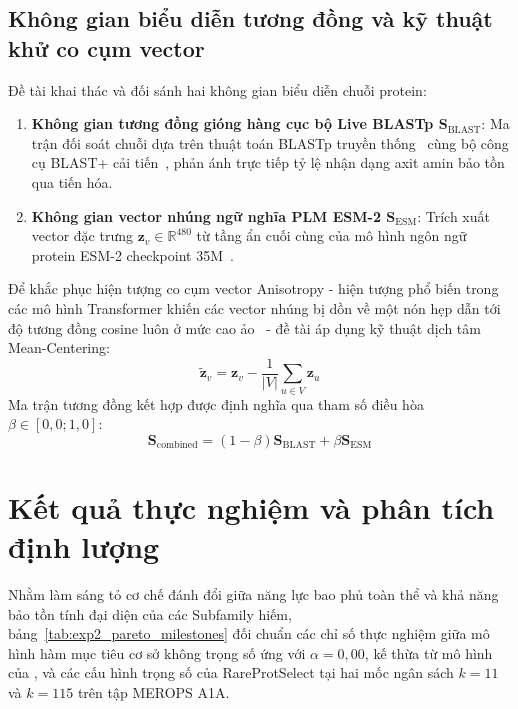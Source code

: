 \subsection{Không gian biểu diễn tương đồng và kỹ thuật khử co cụm vector}
Đề tài khai thác và đối sánh hai không gian biểu diễn chuỗi protein:
\begin{enumerate}[noitemsep,topsep=2pt]
    \item \textbf{Không gian tương đồng gióng hàng cục bộ Live BLASTp $\mathbf{S}_{\text{BLAST}}$}: Ma trận đối soát chuỗi dựa trên thuật toán BLASTp truyền thống~\cite{blast} cùng bộ công cụ BLAST+ cải tiến~\cite{camacho2009}, phản ánh trực tiếp tỷ lệ nhận dạng axit amin bảo tồn qua tiến hóa.
    \item \textbf{Không gian vector nhúng ngữ nghĩa PLM ESM-2 $\mathbf{S}_{\text{ESM}}$}: Trích xuất vector đặc trưng $\mathbf{z}_v \in \mathbb{R}^{480}$ từ tầng ẩn cuối cùng của mô hình ngôn ngữ protein ESM-2 checkpoint 35M~\cite{esm2}.
\end{enumerate}

Để khắc phục hiện tượng co cụm vector Anisotropy - hiện tượng phổ biến trong các mô hình Transformer khiến các vector nhúng bị dồn về một nón hẹp dẫn tới độ tương đồng cosine luôn ở mức cao ảo~\cite{ethayarajh2019} - đề tài áp dụng kỹ thuật dịch tâm Mean-Centering:
\begin{equation}
    \tilde{\mathbf{z}}_v = \mathbf{z}_v - \frac{1}{|V|} \sum_{u \in V} \mathbf{z}_u
    \label{eq:mean_centering}
\end{equation}
Ma trận tương đồng kết hợp được định nghĩa qua tham số điều hòa $\beta \in [0{,}0; 1{,}0]$:
\begin{equation}
    \mathbf{S}_{\text{combined}} = (1 - \beta) \mathbf{S}_{\text{BLAST}} + \beta \mathbf{S}_{\text{ESM}}
    \label{eq:combined_similarity}
\end{equation}

\section{Kết quả thực nghiệm và phân tích định lượng}
\label{sec:ket_qua_thuc_nghiem}

Nhằm làm sáng tỏ cơ chế đánh đổi giữa năng lực bao phủ toàn thể và khả năng bảo tồn tính đại diện của các Subfamily hiếm, bảng~\ref{tab:exp2_pareto_milestones} đối chuẩn các chỉ số thực nghiệm giữa mô hình hàm mục tiêu cơ sở không trọng số ứng với $\alpha = 0{,}00$, kế thừa từ mô hình của \cite{nguyen2025}, và các cấu hình trọng số của RareProtSelect tại hai mốc ngân sách $k = 11$ và $k = 115$ trên tập MEROPS A1A.

